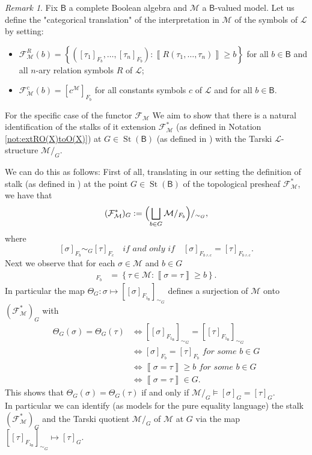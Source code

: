 \documentclass[11pt]{amsart}
\newcommand{\LL}{\mathcal{L}}
\newcommand{\F}{\mathcal{F}}
\theoremstyle{plain}
\theoremstyle{definition}
\theoremstyle{plain}
\theoremstyle{remark}
\newtheorem{remark}[theorem]{Remark}
\newcommand{\M}{\mathcal{M}}
\DeclareMathOperator{\St}{St}
\newcommand{\bool}[1]{\mathsf{#1}}
\newcommand{\Qp}[1]{\left\llbracket #1 \right\rrbracket}
\newcommand{\bp}[1]{\left\lbrace #1 \right\rbrace}
\newcommand{\0}{\mathsf{0}}
\renewcommand{\1}{\mathsf{1}}
\renewcommand{\2}{\mathsf{2}}
\theoremstyle{definition}
\begin{document}
\begin{remark}\label{rem:stalks=quots}
Fix $\bool{B}$ a complete Boolean algebra and $\M$ a $\bool{B}$-valued model. 
Let us define the "categorical translation" of the interpretation in $\M$ of the symbols of $\LL$ by setting:
\begin{itemize}
\item $\mathcal{F}_\M^R(b)=\bp{([\tau_1]_{F_b},\dots,[\tau_n]_{F_b}):\Qp{R(\tau_1,\dots,\tau_n)}\geq b}$ for all $b\in\bool{B}$ and all $n$-ary relation symbols $R$ of $\LL$;
\item $\mathcal{F}_\M^c(b)=[c^\M]_{F_b}$ for all constants symbols $c$ of $\LL$ and for all $b\in\bool{B}$.
\end{itemize}




For the specific case of the functor $\F_\M$ 
We aim to show that there is a natural identification of the stalks of it extension $\F^*_\M$ (as defined in Notation \ref{not:extRO(X)toO(X)}) at $G\in\St(\bool{B})$ (as defined in \cite[Chapter II]{MacLMoer}) with the Tarski $\LL$-structure $\M/_G$.

We can do this as follows:
First of all, translating  in our setting the definition of stalk (as defined in \cite[Chapter II]{MacLMoer}) at the point $G\in\St(\bool{B})$ of the topological presheaf $\F^*_\M$, we have that 
\[
(\F^*_\M)_G:=\Bigl(\bigsqcup_{b\in G}\M/_{F_b}\Bigr)/_{\sim_G},
\]
 where 
\[
 [\sigma]_{F_b}\sim_G[\tau]_{F_c}\quad\textit{if and only if}\quad[\sigma]_{F_{b\wedge c}}=
 [\tau]_{F_{b\wedge c}}.
 \]
Next we observe that for each $\sigma\in\M$ and $b\in G$
\begin{align*}
[\sigma]_{F_b}&=
\bp{\tau\in\M: \Qp{\sigma=\tau}\geq b}.
\end{align*}
In particular the map $\Theta_G:\sigma\mapsto [[\sigma]_{F_{1_{\bool{B}}}}]_{\sim_G}$ 
defines a surjection of $\M$ onto 
$(\F^*_\M)_G$ with 
\[
\begin{aligned}
\Theta_G(\sigma)=\Theta_G(\tau)&\Longleftrightarrow[[\sigma]_{F_{1_{\bool{B}}}}]_{\sim_G}=[[\tau]_{F_{1_{\bool{B}}}}]_{\sim_G}\\
&\Longleftrightarrow[\sigma]_{F_b}=[\tau]_{F_b}\textit{ for some }b\in G\\
&\Longleftrightarrow\Qp{\sigma=\tau}\geq b\textit{ for some }b\in G\\
&\Longleftrightarrow\Qp{\sigma=\tau}\in G.
\end{aligned}
\]
This shows that $\Theta_G(\sigma)=\Theta_G(\tau)$ if and only if $\M/_G\models [\sigma]_G=[\tau]_G$.\\
In particular we can identify (as models for the pure equality language) the stalk $(\F^*_\M)_G$ and the Tarski quotient $\M/_G$ of $\M$ at $G$ via the map 
$[[\tau]_{F_{1_\bool{B}}}]_{\sim_G}\mapsto [\tau]_G$.


\end{remark}
\end{document}
